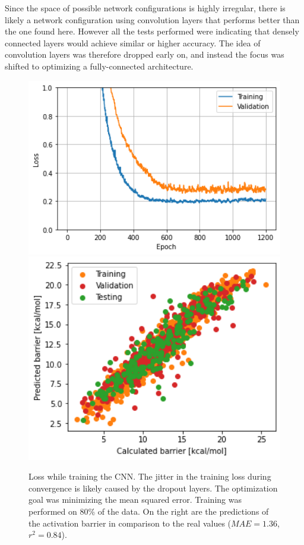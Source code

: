 Since the space of possible network configurations is highly irregular, there is likely a network configuration using convolution layers 
that performs better than the one found here.
However all the tests performed were indicating that densely connected layers would achieve similar or higher accuracy.
The idea of convolution layers was therefore dropped early on, and instead the focus was shifted to optimizing a fully-connected architecture.

\begin{figure}[!htb]
    \endminipage\hfill
      \includegraphics[width=1.0\textwidth]{figures/regression/fourier/cnn/lossCNN.png}
    \endminipage\hfill
      \includegraphics[width=1.0\textwidth]{figures/regression/fourier/cnn/scatterCNN.png}
    \endminipage\hfill
    \endminipage
    \caption{
        Loss while training the CNN. The jitter in the training loss during convergence is likely caused by the dropout layers. 
        The optimization goal was minimizing the mean squared error. 
        Training was performed on 80\% of the data.
        On the right are the predictions of the activation barrier in comparison to the real values ($MAE=1.36$, $r^2=0.84$).
    }
    \label{fig:fourier_cnn}
\end{figure}

